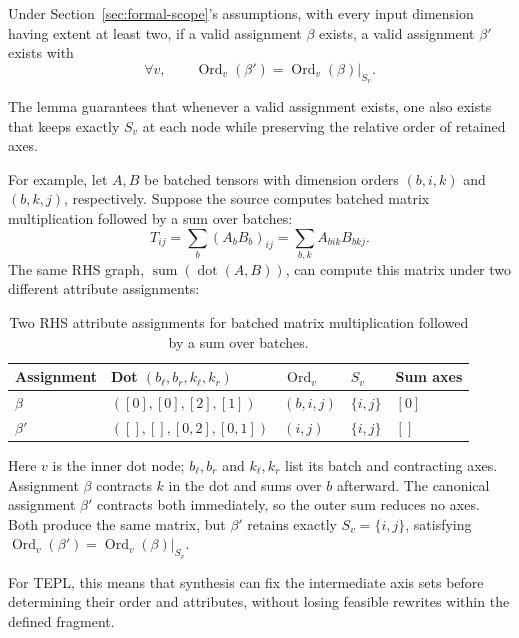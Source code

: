 \begin{lemma}
\label{lem:canonicalization}
Under Section~\ref{sec:formal-scope}'s assumptions, with every input dimension
having extent at least two, if a valid assignment $\beta$ exists, a valid
assignment $\beta'$ exists with
\begin{equation}
 \forall v,\qquad
 \operatorname{Ord}_v(\beta')=\operatorname{Ord}_v(\beta)|_{S_v}.
 \label{eq:canonicalization}
\end{equation}
\end{lemma}
The lemma guarantees that whenever a valid assignment exists, one also
exists that keeps exactly $S_v$ at each node while preserving the relative
order of retained axes.

For example, let $A,B$ be batched tensors with dimension orders $(b,i,k)$
and $(b,k,j)$, respectively. Suppose the source computes batched matrix
multiplication followed by a sum over batches:
\[
 T_{ij}=\sum_b(A_bB_b)_{ij}=\sum_{b,k}A_{bik}B_{bkj}.
\]
The same RHS graph, $\operatorname{sum}(\operatorname{dot}(A,B))$, can
compute this matrix under two different attribute assignments:
\begin{table}[!htbp]
\caption{Two RHS attribute assignments for batched matrix multiplication followed by a sum over batches.}
\label{tab:canonical-example}
\centering
\small
\begin{tabular}{@{}lllll@{}}\toprule
Assignment & Dot $(b_\ell,b_r,k_\ell,k_r)$ & $\operatorname{Ord}_v$ & $S_v$ & Sum axes\\\midrule
$\beta$ & $([0],[0],[2],[1])$ & $(b,i,j)$ & $\{i,j\}$ & $[0]$\\
$\beta'$ & $([],[],[0,2],[0,1])$ & $(i,j)$ & $\{i,j\}$ & $[]$\\\bottomrule
\end{tabular}
\end{table}
Here $v$ is the inner dot node; $b_\ell,b_r$ and $k_\ell,k_r$ list its
batch and contracting axes. Assignment $\beta$ contracts $k$ in the dot
and sums over $b$ afterward. The canonical assignment $\beta'$ contracts
both immediately, so the outer sum reduces no axes. Both produce the same
matrix, but $\beta'$ retains exactly $S_v=\{i,j\}$, satisfying
$\operatorname{Ord}_v(\beta')=\operatorname{Ord}_v(\beta)|_{S_v}$.

For TEPL, this means that synthesis can fix the intermediate axis sets
before determining their order and attributes, without losing feasible
rewrites within the defined fragment.

